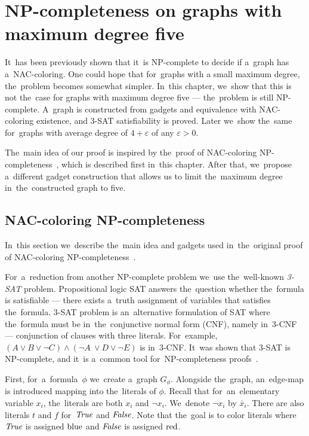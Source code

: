 \chapter{NP-completeness on graphs with maximum degree five}%
\label{chapter:np}

\begin{chapterabstract}

	It~has been previously shown that it~is NP-complete to decide
	if a~graph has a~NAC-coloring.
	One could hope that for~graphs with a small maximum degree,
	the~problem becomes somewhat simpler.
	In~this chapter, we~show that this is not the~case
	for graphs with maximum degree five --- the~problem is still NP-complete.
	A~graph is constructed from gadgets and equivalence
	with NAC-coloring existence, and 3-SAT satisfiability is proved.
	Later we~show the~same for~graphs with average degree of
	$4+\varepsilon$ of any $\varepsilon > 0$.

\end{chapterabstract}

The~main idea of our proof is inspired by
the~proof of NAC-coloring NP-completeness~\cite{np_complete},
which is described first in~this chapter.
After that, we~propose a~different gadget construction
that allows us to limit the~maximum
degree in~the~constructed graph to five.

\section{NAC-coloring NP-completeness}

In~this section we~describe the~main idea and gadgets used
in~the~original proof of NAC-coloring NP-completeness~\cite{np_complete}.

For~a~reduction from another NP-complete problem
we~use the~well-known \emph{3-SAT} problem.
Propositional logic SAT answers the~question
whether the~formula is satisfiable ---
there exists a~truth assignment of variables that satisfies the~formula.
3-SAT problem is an~alternative formulation of SAT
where the~formula must be in~the~conjunctive normal form (CNF), namely in~3-CNF
--- conjunction of clauses with three literals.
For~example, \( (A \lor B \lor \lnot C) \land (\lnot A~\lor D \lor \lnot E) \)
is in~3-CNF\@.
It~was shown that 3-SAT is NP-complete,
and it~is a~common tool for~NP-completeness proofs~\cite{3-sat}.

First, for~a~formula~\( \phi \) we~create a~graph \( G_\phi \).
Alongside the~graph, an~edge-map is introduced mapping into the~literals
of \( \phi \). Recall that for~an~elementary variable \( x_i \), the~literals
are both \( x_i \) and \( \neg x_i \). We~denote \( \lnot x_i \) by \( \bar{x}_i \).
There are also literals \( t \) and \( f \) for~\( \textit{True} \) and \( \textit{False} \).
Note that the~goal is to color literals where \( \textit{True} \) is assigned \( \text{blue} \)
and \( \textit{False} \) is assigned \( \text{red} \).

